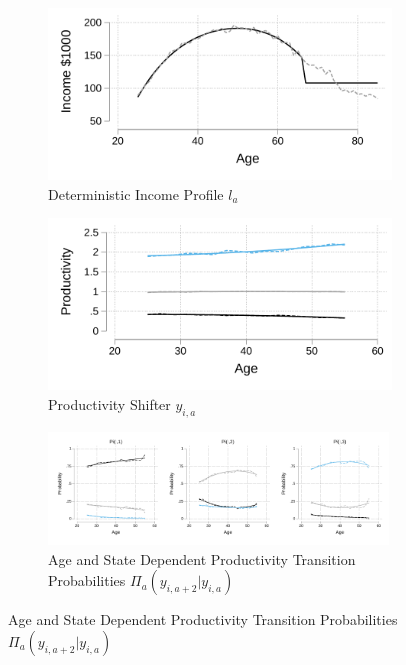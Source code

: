 \documentclass[12pt]{article}
\begin{document}
\begin{figure}\caption{Calibrated Income Process}\label{fig:calincome}
	\begin{subfigure}{0.49\textwidth}\caption{Deterministic Income Profile $l_a$}\label{fig:y_a}
		\includegraphics[width=\textwidth]{../tabfig/empirical/lifecycleincome.pdf}%
	\end{subfigure} %
	\begin{subfigure}{0.49\textwidth}\caption{Productivity Shifter $y_{i,a}$}\label{fig:y_ia}
		\includegraphics[width=\textwidth]{../tabfig/empirical/lifecycleproductivity_3.pdf}
	\end{subfigure}

	\begin{subfigure}{\textwidth}\caption{Age and State Dependent Productivity Transition Probabilities $\Pi_a(y_{i,a+2}|y_{i,a})$}\label{fig:Piv}
		\includegraphics[width=0.99\textwidth]{../tabfig/empirical/Pi_vk_3.pdf} 


\end{subfigure}
\end{figure}
\end{document}
